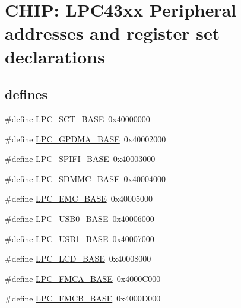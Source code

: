 \hypertarget{group___p_e_r_i_p_h__43_x_x___b_a_s_e}{}\section{C\+H\+IP\+: L\+P\+C43xx Peripheral addresses and register set declarations}
\label{group___p_e_r_i_p_h__43_x_x___b_a_s_e}
\subsection*{\textquotesingle{}defines\textquotesingle{}}
\begin{DoxyCompactItemize}
\item 
\#define \hyperlink{group___p_e_r_i_p_h__43_x_x___b_a_s_e_gad39ca0e94488b4bee5510b2e8bc5a708}{L\+P\+C\+\_\+\+S\+C\+T\+\_\+\+B\+A\+SE}~0x40000000
\item 
\#define \hyperlink{group___p_e_r_i_p_h__43_x_x___b_a_s_e_ga51ba8e3f33730fa2b78be3f892d8c278}{L\+P\+C\+\_\+\+G\+P\+D\+M\+A\+\_\+\+B\+A\+SE}~0x40002000
\item 
\#define \hyperlink{group___p_e_r_i_p_h__43_x_x___b_a_s_e_gad284a5971366e0a8b5fe9881fdb9aa0c}{L\+P\+C\+\_\+\+S\+P\+I\+F\+I\+\_\+\+B\+A\+SE}~0x40003000
\item 
\#define \hyperlink{group___p_e_r_i_p_h__43_x_x___b_a_s_e_ga4175c6e418d0b209c42f789cfa9ff32b}{L\+P\+C\+\_\+\+S\+D\+M\+M\+C\+\_\+\+B\+A\+SE}~0x40004000
\item 
\#define \hyperlink{group___p_e_r_i_p_h__43_x_x___b_a_s_e_ga52f586bf3c6855ad4ef03b1fee3f2f0d}{L\+P\+C\+\_\+\+E\+M\+C\+\_\+\+B\+A\+SE}~0x40005000
\item 
\#define \hyperlink{group___p_e_r_i_p_h__43_x_x___b_a_s_e_ga41d15fd328f821807d202d6c9feb096c}{L\+P\+C\+\_\+\+U\+S\+B0\+\_\+\+B\+A\+SE}~0x40006000
\item 
\#define \hyperlink{group___p_e_r_i_p_h__43_x_x___b_a_s_e_ga72922dbb8f7e3016015922b225773710}{L\+P\+C\+\_\+\+U\+S\+B1\+\_\+\+B\+A\+SE}~0x40007000
\item 
\#define \hyperlink{group___p_e_r_i_p_h__43_x_x___b_a_s_e_gae1746cd618a1eb4f24f95255594f159a}{L\+P\+C\+\_\+\+L\+C\+D\+\_\+\+B\+A\+SE}~0x40008000
\item 
\#define \hyperlink{group___p_e_r_i_p_h__43_x_x___b_a_s_e_gaf59ae457b89f9991f1528a5625234445}{L\+P\+C\+\_\+\+F\+M\+C\+A\+\_\+\+B\+A\+SE}~0x4000\+C000
\item 
\#define \hyperlink{group___p_e_r_i_p_h__43_x_x___b_a_s_e_ga9c9492ce5a1b5e99d6500db256f020c6}{L\+P\+C\+\_\+\+F\+M\+C\+B\+\_\+\+B\+A\+SE}~0x4000\+D000

\end{DoxyCompactItemize}
